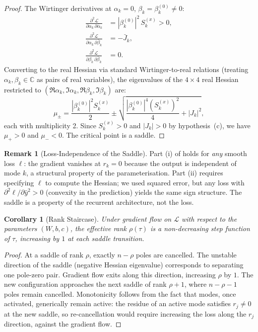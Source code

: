 \documentclass[11pt,a4paper]{article}
\newtheorem{corollary}[theorem]{Corollary}
\theoremstyle{definition}
\newtheorem{remark}[theorem]{Remark}
\newcommand{\C}{\mathbb{C}}
\newcommand{\cL}{\mathcal{L}}
\begin{document}
\begin{proof}
The Wirtinger derivatives at $\alpha_k = 0$,
$\beta_k = \beta_k^{(0)} \neq 0$:
\begin{align}
  \frac{\partial^2\cL}
    {\partial\alpha_k\,\partial\bar{\alpha}_k}
  &= |\beta_k^{(0)}|^2\, S_k^{(x)} > 0,
  \label{eq:hess_aa} \\
  \frac{\partial^2\cL}
    {\partial\alpha_k\,\partial\bar{\beta}_k}
  &= -\bar{J}_k, \label{eq:hess_ab} \\
  \frac{\partial^2\cL}
    {\partial\beta_k\,\partial\bar{\beta}_k}
  &= 0. \label{eq:hess_bb}
\end{align}
Converting to the real Hessian via standard Wirtinger-to-real
relations (treating $\alpha_k, \beta_k \in \C$ as pairs of real
variables), the eigenvalues of the $4\times 4$ real Hessian
restricted to $(\Re\alpha_k, \Im\alpha_k, \Re\beta_k,
\Im\beta_k)$ are:
\begin{equation}\label{eq:hessian_eigs}
  \mu_{\pm}
  = \frac{|\beta_k^{(0)}|^2 S_k^{(x)}}{2}
  \pm \sqrt{
    \frac{|\beta_k^{(0)}|^4 (S_k^{(x)})^2}{4} + |J_k|^2
  },
\end{equation}
each with multiplicity 2. Since $S_k^{(x)} > 0$ and
$|J_k| > 0$ by hypothesis~(c), we have $\mu_+ > 0$ and
$\mu_- < 0$. The critical point is a saddle.
\end{proof}

\begin{remark}[Loss-Independence of the Saddle]\label{rem:loss_indep}
Part (i) of  holds for \emph{any} smooth loss
$\ell$: the gradient vanishes at $r_k = 0$ because the output is
independent of mode $k$, a structural property of the
parameterisation. Part (ii) requires specifying $\ell$ to compute
the Hessian; we used squared error, but any loss with
$\partial^2\ell/\partial\hat{y}^2 > 0$ (convexity in the
prediction) yields the same sign structure. The saddle is a
property of the recurrent architecture, not the loss.
\end{remark}

\begin{corollary}[Rank Staircase]\label{cor:staircase}
Under gradient flow on $\cL$ with respect to the parameters
$(W, b, c)$, the effective rank $\rho(\tau)$ is a non-decreasing
step function of $\tau$, increasing by $1$ at each saddle
transition.
\end{corollary}

\begin{proof}
At a saddle of rank $\rho$, exactly $n - \rho$ poles are cancelled.
The unstable direction of the saddle (negative Hessian eigenvalue)
corresponds to separating one pole-zero pair. Gradient flow exits
along this direction, increasing $\rho$ by $1$. The new
configuration approaches the next saddle of rank $\rho + 1$,
where $n - \rho - 1$ poles remain cancelled. Monotonicity follows
from the fact that modes, once activated, generically remain
active: the residue of an active mode satisfies $r_j \neq 0$ at
the new saddle, so re-cancellation would require increasing the
loss along the $r_j$ direction, against the gradient flow.
\end{proof}
\end{document}
